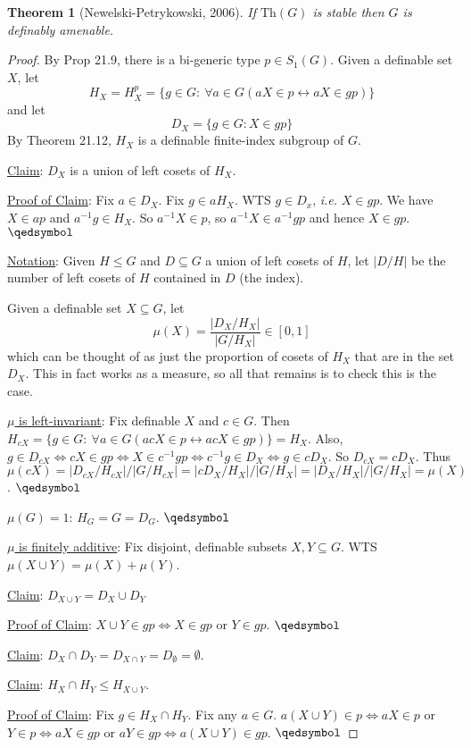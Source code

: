 \documentclass[]{article}
\theoremstyle{custhm}
\newtheorem{theorem}{Theorem}[section]
\theoremstyle{cusdef}
\theoremstyle{custhm}
\theoremstyle{custhm}
\theoremstyle{custhm}
\theoremstyle{ex}
\theoremstyle{custhm}
\theoremstyle{cusdef}
\theoremstyle{remark}
\theoremstyle{remark}
\theoremstyle{numremark}
\renewcommand{\it}[1]{\textit{#1}}
\newcommand{\Th}{\textrm{Th}}
\newcommand{\liff}{\longleftrightarrow}
\renewcommand{\subset}{\subseteq}
\begin{document}
\begin{theorem}[Newelski-Petrykowski, 2006]
	If $\Th(G)$ is stable then $G$ is definably amenable.
\end{theorem}
\begin{proof}
	By Prop 21.9, there is a bi-generic type $p \in S_1(G)$. Given a definable set $X$, let $$H_X = H^p_X = \{g \in G :\ \forall a \in G (aX \in p \liff aX \in gp)\}$$ and let $$D_X = \{g \in G : X \in gp\}$$
	By Theorem 21.12, $H_X$ is a definable finite-index subgroup of $G$.

	\underline{Claim}: $D_X$ is a union of left cosets of $H_X$.

	\underline{Proof of Claim}: Fix $a \in D_X$. Fix $g \in aH_X$. WTS $g \in D_x$, \it{i.e.} $X \in gp$. We have $X \in ap$ and $a^{-1}g \in H_X$. So $a^{-1}X \in p$, so $a^{-1}X \in a^{-1}gp$ and hence $X \in gp$. $\qedsymbol$

	\underline{Notation}: Given $H\le G$ and $D\subset G$ a union of left cosets of $H$, let $| D/H |$ be the number of left cosets of $H$ contained in $D$ (the index).

	Given a definable set $X\subset G$, let $$\mu(X) = \frac{|D_X/H_X|}{|G/H_X|} \in [0,1]$$ which can be thought of as just the proportion of cosets of $H_X$ that are in the set $D_X$. This in fact works as a measure, so all that remains is to check this is the case.

	\underline{$\mu$ is left-invariant}: Fix definable $X$ and $c \in G$. Then $H_{cX} = \{g \in G : \ \forall a \in G (acX \in p \liff acX \in gp)\} = H_X$. Also, $g \in D_{cX} \iff cX \in gp \iff X \in c^{-1}gp \iff c^{-1}g \in D_X \iff g \in cD_{X}$. So $D_{cX} = cD_X$. Thus $\mu(cX) = |D_{cX}/H_{cX}|/|G/H_{cX}| = |cD_X/H_X|/|G/H_X| = |D_X/H_X|/|G/H_X| = \mu(X)$. $\qedsymbol$

	\underline{$\mu(G) = 1$}: $H_G = G = D_G$. $\qedsymbol$

	\underline{$\mu$ is finitely additive}: Fix disjoint, definable subsets $X,Y \subset G$. WTS $\mu(X\cup Y) = \mu (X) + \mu(Y)$.

	\underline{Claim}: $D_{X\cup Y} = D_X \cup D_Y$

	\underline{Proof of Claim}: $X\cup Y \in gp \iff X \in gp$ or $Y \in gp$. $\qedsymbol$

	\underline{Claim}: $D_X \cap D_Y = D_{X\cap Y} = D_\emptyset = \emptyset$.

	\underline{Claim}: $H_X \cap H_Y \le H_{X\cup Y}$.

	\underline{Proof of Claim}: Fix $g \in H_X \cap H_Y$. Fix any $a \in G$. $a(X\cup Y) \in p \iff aX\in p$ or $Y \in p \iff aX \in gp$ or $aY \in gp \iff a(X\cup Y) \in gp$. $\qedsymbol$


\end{proof}
\end{document}
